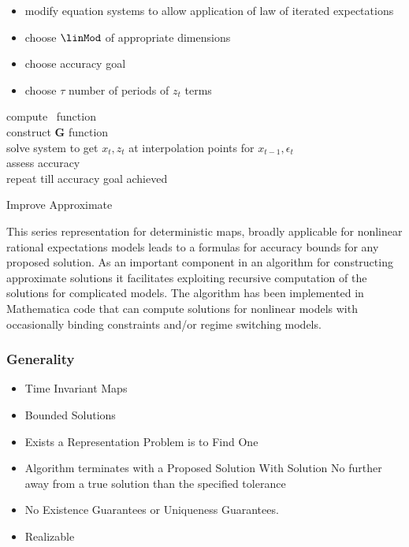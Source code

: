 \documentclass[12pt]{article}
\begin{document}
\begin{itemize}
\item modify equation systems to allow application of law of iterated expectations
\item choose $\linMod$ of appropriate dimensions
\item choose accuracy goal
\item choose $\tau$ number of periods of $z_t$ terms
\end{itemize}
  \begin{algorithm}[H]
compute \ADRCE\  function\\
construct $\mathbf{G}$ function\\
solve system to get $x_t,z_t$ at interpolation points for $x_{t-1},\epsilon_t$\\
assess accuracy\\
repeat till accuracy goal achieved
\caption{Improve Approximate \ADR }
  \end{algorithm}


This series representation for deterministic maps,
broadly applicable for nonlinear rational expectations models 
leads to a formulas for accuracy bounds for any proposed solution.
As an important component in an algorithm for
constructing approximate solutions it
facilitates exploiting recursive computation of the solutions for complicated models.
The algorithm has been implemented in
Mathematica code that can compute solutions for
nonlinear models with occasionally binding constraints and/or regime switching models.






\subsubsection{Generality}
\label{sec:generality}




\begin{itemize}
\item Time Invariant Maps
\item Bounded Solutions
\item Exists a Representation Problem is to Find One
\item Algorithm terminates with a Proposed Solution With Solution
  No further away from a true solution than the specified tolerance 
\item No Existence Guarantees or Uniqueness Guarantees.
\item Realizable
\end{itemize}
\end{document}
